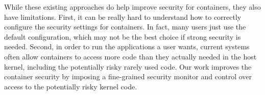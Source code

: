 While these existing approaches do help improve security for containers, they also have limitations. First, it can be really hard to understand how to correctly configure the security settings for containers. 
In fact, many users just use the default configuration, which may not be the best choice if strong security is needed. 
Second, in order to run the applications a user wants, current systems often allow containers to access more code than they actually needed in the host kernel, including the potentially risky rarely used code. 
Our work improves the container security by imposing a fine-grained security monitor and control over access to the potentially risky kernel code. 